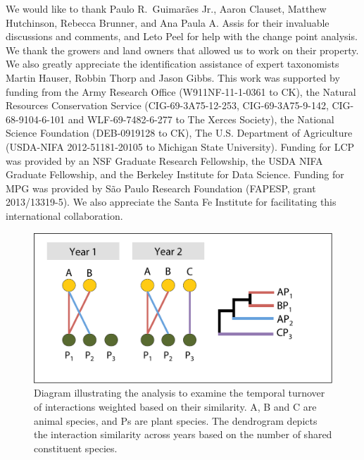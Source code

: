 \documentclass[12pt]{article}
\begin{document}
We would like to thank Paulo R.~Guimar{\~a}es Jr., Aaron Clauset,
Matthew Hutchinson, Rebecca Brunner, and Ana Paula A. Assis for their
invaluable discussions and comments, and Leto Peel for help with the
change point analysis.  We thank the growers and land owners that
allowed us to work on their property. We also greatly appreciate the
identification assistance of expert taxonomists Martin Hauser, Robbin
Thorp and Jason Gibbs.  This work was supported by funding from the
Army Research Office (W911NF-11-1-0361 to CK), the Natural Resources
Conservation Service (CIG-69-3A75-12-253, CIG-69-3A75-9-142,
CIG-68-9104-6-101 and WLF-69-7482-6-277 to The Xerces Society), the
National Science Foundation (DEB-0919128 to CK), The U.S.  Department
of Agriculture (USDA-NIFA 2012-51181-20105 to Michigan State
University).  Funding for LCP was provided by an NSF Graduate Research
Fellowship, the USDA NIFA Graduate Fellowship, and the Berkeley
Institute for Data Science. Funding for MPG was provided by S{\~a}o
Paulo Research Foundation (FAPESP, grant 2013/13319-5). We also
appreciate the Santa Fe Institute for facilitating this international
collaboration.






\clearpage
\begin{figure}
  \centering
  \includegraphics[width=.8\textwidth]{figures/scheme.pdf}
  \caption{Diagram illustrating the analysis to examine the temporal
    turnover of interactions weighted based on their similarity. A, B
    and C are animal species, and Ps are plant species. The dendrogram
    depicts the interaction similarity across years based on the
    number of shared constituent species.}
  \label{fig:methods}
\end{figure}
\clearpage
\end{document}
